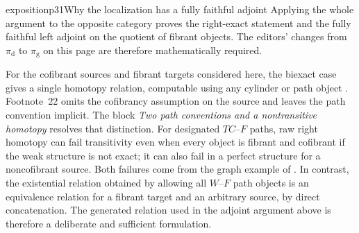 \begin{dcomment}{exposition}{p31}{Why the localization has a fully faithful adjoint}
Applying the whole argument to the opposite category proves the right-exact statement and the fully faithful left adjoint on the quotient of fibrant objects. The editors' changes from $\pi_{\mathrm d}$ to $\pi_{\mathrm g}$ on this page are therefore mathematically required.

For the cofibrant sources and fibrant targets considered here, the biexact case gives a single homotopy relation, computable using any cylinder or path object \citep[Lemma~2.2.12]{Cisinski2019HigherCategories}. Footnote~22 omits the cofibrancy assumption on the source and leaves the path convention implicit. The block \emph{Two path conventions and a nontransitive homotopy} resolves that distinction. For designated $TC$--$F$ paths, raw right homotopy can fail transitivity even when every object is fibrant and cofibrant if the weak structure is not exact; it can also fail in a perfect structure for a noncofibrant source. Both failures come from the graph example of \citet[Example~3.6]{KurzRosicky2005}. In contrast, the existential relation obtained by allowing all $W$--$F$ path objects is an equivalence relation for a fibrant target and an arbitrary source, by direct concatenation. The generated relation used in the adjoint argument above is therefore a deliberate and sufficient formulation.
\end{dcomment}


